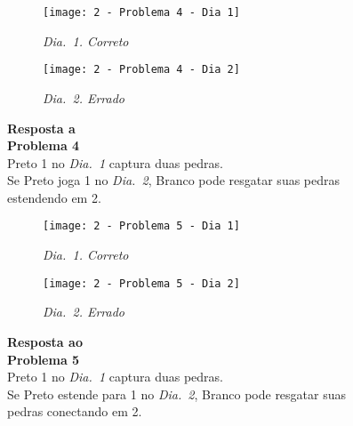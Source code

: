 \begin{SCfigure}[][h!]
    \begin{subfigure}[t]{.31\textwidth}
        \texttt{[image: 2 - Problema 4 - Dia 1]}
        \captionsetup{justification=centering}
        \caption*{\emph{Dia.\@~1. Correto}}
    \end{subfigure}
    \hfill
    \begin{subfigure}[t]{.31\textwidth}
        \texttt{[image: 2 - Problema 4 - Dia 2]}
        \captionsetup{justification=centering}
        \caption*{\emph{Dia.\@~2. Errado}}
    \end{subfigure}
    \hfill
    \caption*{\textbf{Resposta a\\Problema 4}\\\vspace*{.25cm}Preto 1 no \emph{Dia.\@~1} captura duas pedras.\\\vspace*{.25cm}Se Preto joga 1 no \emph{Dia.\@~2}, Branco pode resgatar suas pedras estendendo em 2.}
\end{SCfigure}

\vfill

\begin{SCfigure}[][h!]
    \begin{subfigure}[t]{.31\textwidth}
        \texttt{[image: 2 - Problema 5 - Dia 1]}
        \captionsetup{justification=centering}
        \caption*{\emph{Dia.\@~1. Correto}}
    \end{subfigure}
    \hfill
    \begin{subfigure}[t]{.31\textwidth}
        \texttt{[image: 2 - Problema 5 - Dia 2]}
        \captionsetup{justification=centering}
        \caption*{\emph{Dia.\@~2. Errado}}
    \end{subfigure}
    \hfill
    \caption*{\textbf{Resposta ao\\Problema 5}\\\vspace*{.25cm}Preto 1 no \emph{Dia.\@~1} captura duas pedras.\\\vspace*{.25cm}Se Preto estende para 1 no \emph{Dia.\@~2}, Branco pode resgatar suas pedras conectando em 2.}
\end{SCfigure}

\vfill


